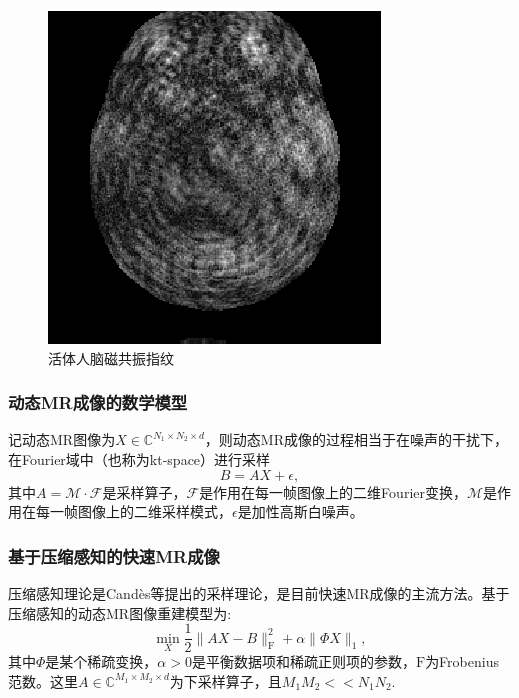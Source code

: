 \documentclass{beamer}
\begin{document}

\begin{frame}
	\frametitle{动态MR成像的数学模型}
记动态MR图像为$X\in \mathbb{C}^{N_1\times N_2\times d}$，则动态MR成像的过程相当于在噪声的干扰下，在Fourier域中（也称为kt-space）进行采样
\begin{equation}
	B=AX+\epsilon,
\end{equation}
其中$A=\mathcal{M}\cdot\mathcal{F}$是采样算子，$\mathcal{F}$是作用在每一帧图像上的二维Fourier变换，$\mathcal{M}$是作用在每一帧图像上的二维采样模式，$\epsilon$是加性高斯白噪声。
\end{frame}

\begin{frame}
	\frametitle{基于压缩感知的快速MR成像}
压缩感知理论是Candès等提出的采样理论，是目前快速MR成像的主流方法。基于压缩感知的动态MR图像重建模型为:
	\begin{equation}
	\min_X \frac{1}{2}\|AX-B\|_{\mathrm{F}}^2+\alpha\|\Phi X\|_1,
	\end{equation}
其中$\Phi$是某个稀疏变换，$\alpha>0$是平衡数据项和稀疏正则项的参数，$\mathrm{F}$为Frobenius范数。这里$A\in \mathbb{C}^{M_1\times M_2\times d}$为下采样算子，且$M_1M_2<<N_1N_2$.
\end{frame}
\end{document}
